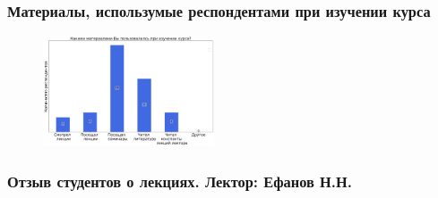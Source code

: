 	\subsubsection{Материалы, использумые респондентами при изучении курса}

		\begin{figure}[H]
			\centering
			\includegraphics[width = 0.45\textwidth]{images/2 course/Компьютерные технологии/materials.png}
		\end{figure}

	\subsubsection{Отзыв студентов о лекциях. Лектор: Ефанов Н.Н.}

